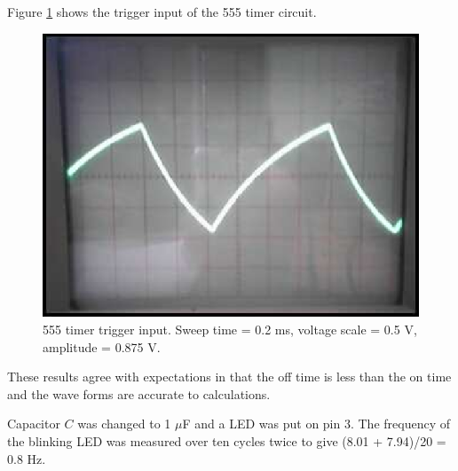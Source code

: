 \documentclass[11pt,onecolumn,letter]{article}
\begin{document}
Figure \ref{fig:555Triangle} shows the trigger input of the 555 timer circuit.
%
%
\begin{figure}
\center
\includegraphics{triangle.eps}
\caption{555 timer trigger input. Sweep time = 0.2 ms, voltage scale = 0.5 V, amplitude = 0.875 V.}\label{fig:555Triangle}
\end{figure}
These results agree with expectations in that the off time is less than the on time and the wave forms are accurate to calculations.

Capacitor $C$ was changed to 1 $\mu$F and a LED was put on pin 3. The frequency of the blinking LED was measured over ten cycles twice to give (8.01 + 7.94)/20 = 0.8 Hz.

%
%
\end{document}
